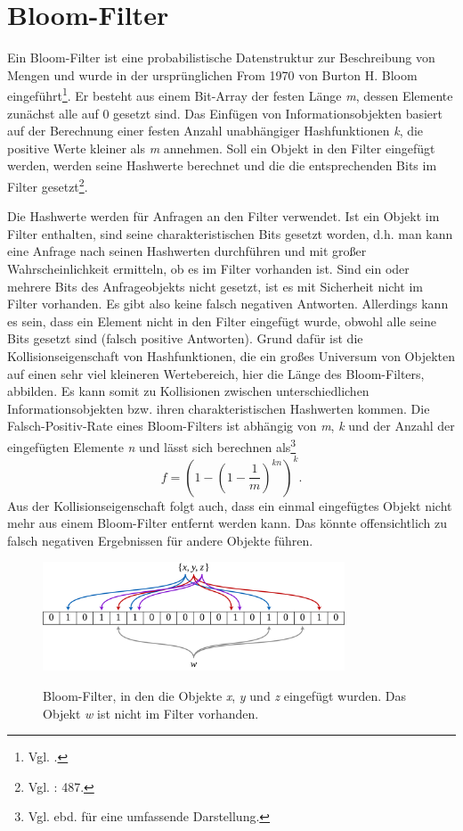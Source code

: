 \section{Bloom-Filter}\label{sec:bloom}
Ein Bloom-Filter ist eine probabilistische Datenstruktur zur Beschreibung von Mengen und wurde in der ursprünglichen From 1970 von Burton H. Bloom eingeführt\footnote{Vgl. \cite{Bloom1970}.}. Er besteht aus einem Bit-Array der festen Länge \textit{m}, dessen Elemente zunächst alle auf 0 gesetzt sind. Das Einfügen von Informationsobjekten basiert auf der Berechnung einer festen Anzahl unabhängiger Hashfunktionen \textit{k}, die positive Werte kleiner als \textit{m} annehmen. Soll ein Objekt in den Filter eingefügt werden, werden seine Hashwerte berechnet und die die entsprechenden Bits im Filter gesetzt\footnote{Vgl. \cite{Broder2004}: 487.}. 

Die Hashwerte werden für Anfragen an den Filter verwendet. Ist ein Objekt im Filter enthalten, sind seine charakteristischen Bits gesetzt worden, d.h. man kann eine Anfrage nach seinen Hashwerten durchführen und mit großer Wahrscheinlichkeit ermitteln, ob es im Filter vorhanden ist. Sind ein oder mehrere Bits des Anfrageobjekts nicht gesetzt, ist es mit Sicherheit nicht im Filter vorhanden. Es gibt also keine falsch negativen Antworten. Allerdings kann es sein, dass ein Element nicht in den Filter eingefügt wurde, obwohl alle seine Bits gesetzt sind (falsch positive Antworten). Grund dafür ist die Kollisionseigenschaft von Hashfunktionen, die ein großes Universum von Objekten auf einen sehr viel kleineren Wertebereich, hier die Länge des Bloom-Filters, abbilden. Es kann somit zu Kollisionen zwischen unterschiedlichen Informationsobjekten bzw. ihren charakteristischen Hashwerten kommen. Die Falsch-Positiv-Rate eines Bloom-Filters ist abhängig von \textit{m}, \textit{k} und der Anzahl der eingefügten Elemente \textit{n} und lässt sich berechnen als\footnote{Vgl. ebd. für eine umfassende Darstellung.}
\[f = \left(1 - \left(1-\frac{1}{m}\right)^{kn}\right)^k.\]
\newpage
\noindent
Aus der Kollisionseigenschaft folgt auch, dass ein einmal eingefügtes Objekt nicht mehr aus einem Bloom-Filter entfernt werden kann. Das könnte offensichtlich zu falsch negativen Ergebnissen für andere Objekte führen. 
\begin{figure}[hpbt]
  \centering
  \includegraphics[width=0.8\textwidth]{pictures/1280px-Bloom_filter.png}\\
  \caption[Bloom-Filter (Bildnachweis: \url{https://commons.wikimedia.org/wiki/File:Bloom_filter.svg})]{Bloom-Filter, in den die Objekte \textit{x}, \textit{y} und \textit{z} eingefügt wurden. Das Objekt \textit{w} ist nicht im Filter vorhanden.}\label{fig:pic0}
\end{figure}
